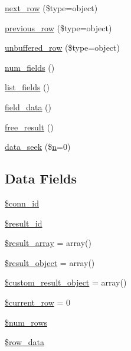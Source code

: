 \begin{DoxyCompactItemize}
\item 
\mbox{\hyperlink{class_c_i___d_b__result_a5664a519252b14c1cdd93d9de0322a9f}{next\+\_\+row}} (\$type=\textquotesingle{}object\textquotesingle{})
\item 
\mbox{\hyperlink{class_c_i___d_b__result_a458567a19d160a814b41b2964ec192ce}{previous\+\_\+row}} (\$type=\textquotesingle{}object\textquotesingle{})
\item 
\mbox{\hyperlink{class_c_i___d_b__result_a75f3fff759e63b51c93bb1588e9b0a77}{unbuffered\+\_\+row}} (\$type=\textquotesingle{}object\textquotesingle{})
\item 
\mbox{\hyperlink{class_c_i___d_b__result_af831bf363e4d7d661a717a4932af449d}{num\+\_\+fields}} ()
\item 
\mbox{\hyperlink{class_c_i___d_b__result_a50b54eb4ea7cfd039740f532988ea776}{list\+\_\+fields}} ()
\item 
\mbox{\hyperlink{class_c_i___d_b__result_a84bffd65e53902ade1591716749a33e3}{field\+\_\+data}} ()
\item 
\mbox{\hyperlink{class_c_i___d_b__result_aad2d98d6beb3d6095405356c6107b473}{free\+\_\+result}} ()
\item 
\mbox{\hyperlink{class_c_i___d_b__result_a8255ae91816e4206e29eb7581c5af0f1}{data\+\_\+seek}} (\$\mbox{\hyperlink{cli_2error__php_8php_a2e6b16bbc42094e4c51ade3c10afdcf1}{n}}=0)
\end{DoxyCompactItemize}
\subsection*{Data Fields}
\begin{DoxyCompactItemize}
\item 
\mbox{\hyperlink{class_c_i___d_b__result_a16c23f1dcbfed2f2759f5e54f604106d}{\$conn\+\_\+id}}
\item 
\mbox{\hyperlink{class_c_i___d_b__result_a0ebacb40e3b6f8bf33d3de0f2cc71474}{\$result\+\_\+id}}
\item 
\mbox{\hyperlink{class_c_i___d_b__result_a153392b3ec395131d32c70cda855698e}{\$result\+\_\+array}} = array()
\item 
\mbox{\hyperlink{class_c_i___d_b__result_aa292cbb3dbb8c654cb4f6c61f250efd3}{\$result\+\_\+object}} = array()
\item 
\mbox{\hyperlink{class_c_i___d_b__result_a680c2e11eeb189d9bb8ba2a552766b7b}{\$custom\+\_\+result\+\_\+object}} = array()
\item 
\mbox{\hyperlink{class_c_i___d_b__result_a2ec3a266ee95cda75cdbb71bc9ee1b53}{\$current\+\_\+row}} = 0
\item 
\mbox{\hyperlink{class_c_i___d_b__result_ac926549b713e71c5f5fd63999cebfb8c}{\$num\+\_\+rows}}
\item 
\mbox{\hyperlink{class_c_i___d_b__result_a335b4c27a1529df9e484e044e470ec07}{\$row\+\_\+data}}
\end{DoxyCompactItemize}
